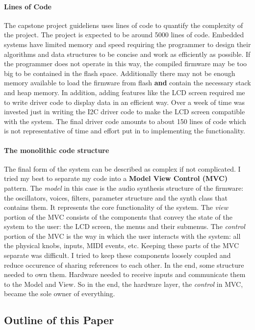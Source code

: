 \documentclass[acmlarge,screen]{acmart}
\begin{document}
	\paragraph{Lines of Code} The capstone project guideliens uses lines of code to quantify the complexity of the project. The project is expected to be around 5000 lines of code. Embedded systems have limited memory and speed requiring the programmer to design their algorithms and data structures to be concise and work as efficiently as possible. If the programmer does not operate in this way, the compiled firmware may be too big to be contained in the flash space. Additionally there may not be enough memory available to load the firmware from flash \textbf{and} contain the necessary stack and heap memory. In addition, adding features like the LCD screen required me to write driver code to display data in an efficient way. Over a week of time was invested just in writing the I2C driver code to make the LCD screen compatible with the system. The final driver code amounts to about 150 lines of code which is not representative of time and effort put in to implementing the functionality.
	
	\paragraph{The monolithic code structure} The final form of the system can be described as complex if not complicated. I tried my best to separate my code into a \textbf{Model View Control (MVC)} pattern. The \textit{model} in this case is the audio synthesis structure of the firmware: the oscillators, voices, filters, parameter structure and the synth class that contains them. It represents the core functionality of the system. The \textit{view} portion of the MVC consists of the components that convey the state of the system to the user: the LCD screen, the menus and their submenus. The \textit{control} portion of the MVC is the way in which the user interacts with the system: all the physical knobs, inputs, MIDI events, etc. Keeping these parts of the MVC separate was difficult. I tried to keep these components loosely coupled and reduce occurence of sharing references to each other. In the end, some structure needed to own them. Hardware needed to receive inputs and communicate them to the Model and View. So in the end, the hardware layer, the \textit{control} in MVC, became the sole owner of everything.
	
\subsection{Outline of this Paper}
\end{document}

